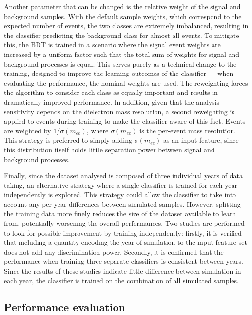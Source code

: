 Another parameter that can be changed is the relative weight of the signal and background samples. With the default sample weights, which correspond to the expected number of events, the two classes are extremely imbalanced, resulting in the classifier predicting the background class for almost all events. To mitigate this, the BDT is trained in a scenario where the signal event weights are increased by a uniform factor such that the total sum of weights for signal and background processes is equal. This serves purely as a technical change to the training, designed to improve the learning outcomes of the classifier --- when evaluating the performance, the nominal weights are used. The reweighting forces the algorithm to consider each class as equally important and results in dramatically improved performance. In addition, given that the analysis sensitivity depends on the dielectron mass resolution, a second reweighting is applied to \ggH events during training to make the classifier aware of this fact. Events are weighted by 1/$\sigma(m_{ee})$, where $\sigma(m_{ee})$ is the per-event mass resolution. This strategy is preferred to simply adding $\sigma(m_{ee})$ as an input feature, since this distribution itself holds little separation power between signal and background processes.

Finally, since the dataset analysed is composed of three individual years of data taking, an alternative strategy where a single classifier is trained for each year independently is explored. This strategy could allow the classifier to take into account any per-year differences between simulated samples. However, splitting the training data more finely reduces the size of the dataset available to learn from, potentially worsening the overall performances. Two studies are performed to look for possible improvement by training independently: firstly, it is verified that including a quantity encoding the year of simulation to the input feature set does not add any discrimination power. Secondly, it is confirmed that the performance when training three separate classifiers is consistent between years. Since the results of these studies indicate little difference between simulation in each year, the classifier is trained on the combination of all simulated samples.

\subsection{Performance evaluation} 

